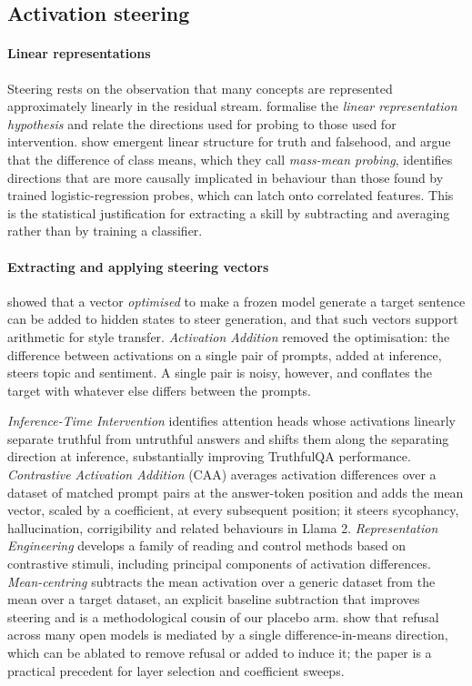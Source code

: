\documentclass[11pt]{article}
\begin{document}
\subsection{Activation steering}

\paragraph{Linear representations} Steering rests on the observation that many concepts are
represented approximately linearly in the residual stream. \citet{park2024linear} formalise the
\emph{linear representation hypothesis} and relate the directions used for probing to those used for
intervention. \citet{marks2024geometry} show emergent linear structure for truth and falsehood, and
argue that the difference of class means, which they call \emph{mass-mean probing}, identifies
directions that are more causally implicated in behaviour than those found by trained
logistic-regression probes, which can latch onto correlated features. This is the statistical
justification for extracting a skill by subtracting and averaging rather than by training a
classifier.

\paragraph{Extracting and applying steering vectors} \citet{subramani2022extracting} showed that a
vector \emph{optimised} to make a frozen model generate a target sentence can be added to hidden
states to steer generation, and that such vectors support arithmetic for style transfer.
\emph{Activation Addition} \citep{turner2023actadd} removed the optimisation: the difference between
activations on a single pair of prompts, added at inference, steers topic and sentiment. A single
pair is noisy, however, and conflates the target with whatever else differs between the prompts.

\emph{Inference-Time Intervention} \citep{li2023iti} identifies attention heads whose activations
linearly separate truthful from untruthful answers and shifts them along the separating direction at
inference, substantially improving TruthfulQA performance. \emph{Contrastive Activation Addition}
(CAA) \citep{panickssery2024caa} averages activation differences over a dataset of matched prompt
pairs at the answer-token position and adds the mean vector, scaled by a coefficient, at every
subsequent position; it steers sycophancy, hallucination, corrigibility and related behaviours in
Llama 2. \emph{Representation Engineering} \citep{zou2023repe} develops a family of reading and
control methods based on contrastive stimuli, including principal components of activation
differences. \emph{Mean-centring} \citep{jorgensen2023meancentring} subtracts the mean activation
over a generic dataset from the mean over a target dataset, an explicit baseline subtraction that
improves steering and is a methodological cousin of our placebo arm. \citet{arditi2024refusal} show
that refusal across many open models is mediated by a single difference-in-means direction, which
can be ablated to remove refusal or added to induce it; the paper is a practical precedent for layer
selection and coefficient sweeps.
\end{document}

